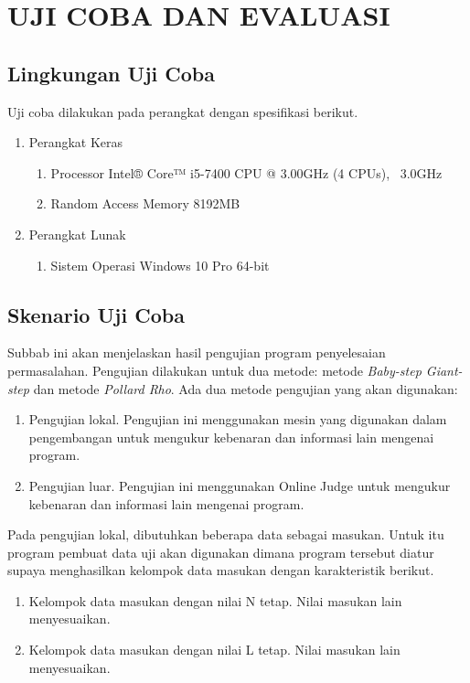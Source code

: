 \chapter{UJI COBA DAN EVALUASI}

\section{Lingkungan Uji Coba}

Uji coba dilakukan pada perangkat dengan spesifikasi berikut.
\begin{enumerate}
	\item Perangkat Keras
	\begin{enumerate}
		\item Processor Intel® Core™ i5-7400 CPU @ 3.00GHz (4 CPUs), ~3.0GHz
		\item Random Access Memory 8192MB
	\end{enumerate}
	\item Perangkat Lunak
	\begin{enumerate}
		\item Sistem Operasi Windows 10 Pro 64-bit
	\end{enumerate}
\end{enumerate}
\section{Skenario Uji Coba}

Subbab ini akan menjelaskan hasil pengujian program penyelesaian permasalahan. Pengujian dilakukan untuk dua metode: metode \textit{Baby-step Giant-step} dan metode \textit{Pollard Rho}. Ada dua metode pengujian yang akan digunakan:

\begin{enumerate}
\item Pengujian lokal. Pengujian ini menggunakan mesin yang digunakan dalam pengembangan untuk mengukur kebenaran dan informasi lain mengenai program.
\item Pengujian luar. Pengujian ini menggunakan Online Judge untuk mengukur kebenaran dan informasi lain mengenai program.
\end{enumerate}

Pada pengujian lokal, dibutuhkan beberapa data sebagai masukan. Untuk itu program pembuat data uji akan digunakan dimana program tersebut diatur supaya menghasilkan kelompok data masukan dengan karakteristik berikut.

\begin{enumerate}
\item Kelompok data masukan dengan nilai N tetap. Nilai masukan lain menyesuaikan.
\item Kelompok data masukan dengan nilai L tetap. Nilai masukan lain menyesuaikan.
\end{enumerate}

